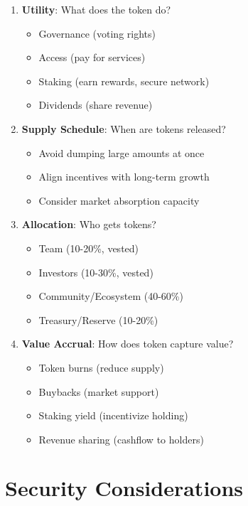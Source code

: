 \documentclass[11pt,a4paper]{article}
\begin{document}
\begin{enumerate}
  \item \textbf{Utility}: What does the token do?
    \begin{itemize}
      \item Governance (voting rights)
      \item Access (pay for services)
      \item Staking (earn rewards, secure network)
      \item Dividends (share revenue)
    \end{itemize}

  \item \textbf{Supply Schedule}: When are tokens released?
    \begin{itemize}
      \item Avoid dumping large amounts at once
      \item Align incentives with long-term growth
      \item Consider market absorption capacity
    \end{itemize}

  \item \textbf{Allocation}: Who gets tokens?
    \begin{itemize}
      \item Team (10-20\%, vested)
      \item Investors (10-30\%, vested)
      \item Community/Ecosystem (40-60\%)
      \item Treasury/Reserve (10-20\%)
    \end{itemize}

  \item \textbf{Value Accrual}: How does token capture value?
    \begin{itemize}
      \item Token burns (reduce supply)
      \item Buybacks (market support)
      \item Staking yield (incentivize holding)
      \item Revenue sharing (cashflow to holders)
    \end{itemize}
\end{enumerate}

\section{Security Considerations}
\end{document}
